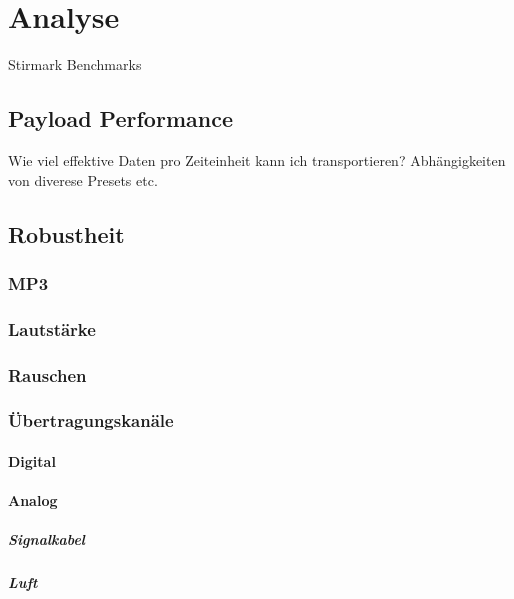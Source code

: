 \chapter{Analyse}
\label{ch:analyse}

Stirmark Benchmarks\cite{petitcolas2000watermarking}\cite{petitcolas2004stirmark}

\section{Payload Performance}
\label{sec:payloadperformance}

Wie viel effektive Daten pro Zeiteinheit kann ich transportieren? Abhängigkeiten von diverese Presets etc.

\section{Robustheit}

\subsection{MP3}

\subsection{Lautstärke}

\subsection{Rauschen}

\subsection{Übertragungskanäle}

\subsubsection{Digital}

\subsubsection{Analog}

\paragraph{Signalkabel}

\paragraph{Luft}







